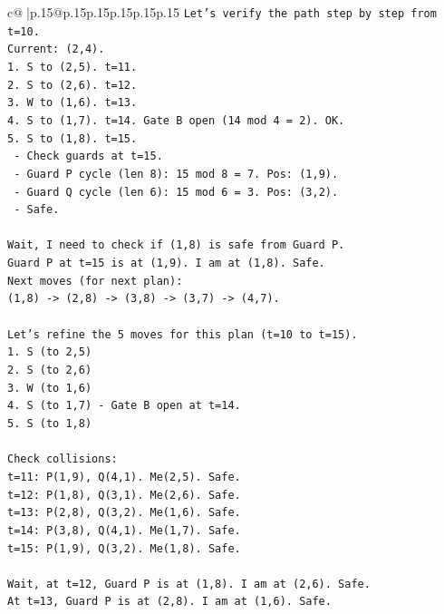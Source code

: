 \documentclass{article}
\begin{document}
{\begin{supertabular}{c@{$\;$}|p{.15\linewidth}@{}p{.15\linewidth}p{.15\linewidth}p{.15\linewidth}p{.15\linewidth}p{.15\linewidth}}
{{{\texttt{Let's verify the path step by step from t=10.} \\
\texttt{Current: (2,4).} \\
\texttt{1. S to (2,5). t=11.} \\
\texttt{2. S to (2,6). t=12.} \\
\texttt{3. W to (1,6). t=13.} \\
\texttt{4. S to (1,7). t=14. Gate B open (14 mod 4 = 2). OK.} \\
\texttt{5. S to (1,8). t=15.} \\
\texttt{   {-} Check guards at t=15.} \\
\texttt{   {-} Guard P cycle (len 8): 15 mod 8 = 7. Pos: (1,9).} \\
\texttt{   {-} Guard Q cycle (len 6): 15 mod 6 = 3. Pos: (3,2).} \\
\texttt{   {-} Safe.} \\
\\ 
\texttt{Wait, I need to check if (1,8) is safe from Guard P.} \\
\texttt{Guard P at t=15 is at (1,9). I am at (1,8). Safe.} \\
\texttt{Next moves (for next plan):} \\
\texttt{(1,8) {-}> (2,8) {-}> (3,8) {-}> (3,7) {-}> (4,7).} \\
\\ 
\texttt{Let's refine the 5 moves for this plan (t=10 to t=15).} \\
\texttt{1. S (to 2,5)} \\
\texttt{2. S (to 2,6)} \\
\texttt{3. W (to 1,6)} \\
\texttt{4. S (to 1,7) {-} Gate B open at t=14.} \\
\texttt{5. S (to 1,8)} \\
\\ 
\texttt{Check collisions:} \\
\texttt{t=11: P(1,9), Q(4,1). Me(2,5). Safe.} \\
\texttt{t=12: P(1,8), Q(3,1). Me(2,6). Safe.} \\
\texttt{t=13: P(2,8), Q(3,2). Me(1,6). Safe.} \\
\texttt{t=14: P(3,8), Q(4,1). Me(1,7). Safe.} \\
\texttt{t=15: P(1,9), Q(3,2). Me(1,8). Safe.} \\
\\ 
\texttt{Wait, at t=12, Guard P is at (1,8). I am at (2,6). Safe.} \\
\texttt{At t=13, Guard P is at (2,8). I am at (1,6). Safe.} \\
}}}
\end{supertabular}}
\end{document}
